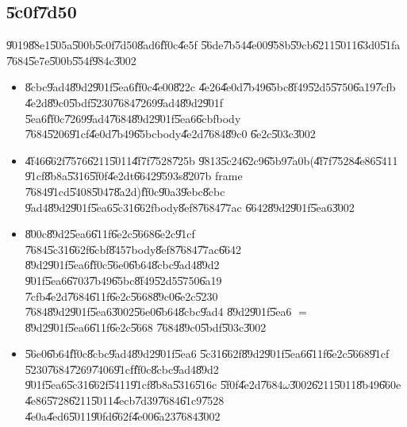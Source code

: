 \documentclass[12pt,a4paper]{article}
\begin{document}
\bigskip 

\subsection{\U{5c0f}\U{7d50}}

\U{9019}\U{88e1}\U{505a}\U{500b}\U{5c0f}\U{7d50}\U{8ad6}\U{ff0c}\U{4e5f}%
\U{56de}\U{7b54}\U{4e00}\U{958b}\U{59cb}\U{6211}\U{5011}\U{63d0}\U{51fa}%
\U{7684}\U{5e7e}\U{500b}\U{554f}\U{984c}\U{3002}

\begin{itemize}
\item \U{8cbc}\U{9ad4}\U{89d2}\U{901f}\U{5ea6}\U{ff0c}\U{4e00}\U{822c}%
\U{4e26}\U{4e0d}\U{7b49}\U{65bc}\U{8f49}\U{52d5}\U{5750}\U{6a19}\U{7cfb}%
\U{4e2d}\U{89c0}\U{5bdf}\U{5230}\U{7684}\U{7269}\U{9ad4}\U{89d2}\U{901f}%
\U{5ea6}\U{ff0c}\U{7269}\U{9ad4}\U{7684}\U{89d2}\U{901f}\U{5ea6}\U{6cbf}body%
\U{7684}\U{5206}\U{91cf}\U{4e0d}\U{7b49}\U{65bc}body\U{4e2d}\U{7684}\U{89c0}%
\U{6e2c}\U{503c}\U{3002}

\item \U{4f46}\U{662f}\U{7576}\U{6211}\U{5011}\U{4f7f}\U{7528}\U{725b}%
\U{9813}\U{5c24}\U{62c9}\U{65b9}\U{7a0b}(\U{4f7f}\U{7528}\U{4e86}\U{5411}%
\U{91cf}\U{8b8a}\U{5316}\U{5f0f}\U{4e2d}t\U{6642}\U{9593}s\U{8207}b frame%
\U{7684}\U{91cd}\U{5408}\U{5047}\U{8a2d})\U{ff0c}\U{90a3}\U{9ebc}\U{8cbc}%
\U{9ad4}\U{89d2}\U{901f}\U{5ea6}\U{5c31}\U{662f}body\U{8ef8}\U{7684}\U{77ac}%
\U{6642}\U{89d2}\U{901f}\U{5ea6}\U{3002}

\item \U{800c}\U{89d2}\U{5ea6}\U{611f}\U{6e2c}\U{5668}\U{6e2c}\U{91cf}%
\U{7684}\U{5c31}\U{662f}\U{6cbf}\U{8457}body\U{8ef8}\U{7684}\U{77ac}\U{6642}%
\U{89d2}\U{901f}\U{5ea6}\U{ff0c}\U{56e0}\U{6b64}\U{8cbc}\U{9ad4}\U{89d2}%
\U{901f}\U{5ea6}\U{6703}\U{7b49}\U{65bc}\U{8f49}\U{52d5}\U{5750}\U{6a19}%
\U{7cfb}\U{4e2d}\U{7684}\U{611f}\U{6e2c}\U{5668}\U{89c0}\U{6e2c}\U{5230}%
\U{7684}\U{89d2}\U{901f}\U{5ea6}\U{3002}\U{56e0}\U{6b64}\U{8cbc}\U{9ad4}%
\U{89d2}\U{901f}\U{5ea6} $=$ \U{89d2}\U{901f}\U{5ea6}\U{611f}\U{6e2c}\U{5668}%
\U{7684}\U{89c0}\U{5bdf}\U{503c}\U{3002}

\item \U{56e0}\U{6b64}\U{ff0c}\U{8cbc}\U{9ad4}\U{89d2}\U{901f}\U{5ea6}%
\U{5c31}\U{662f}\U{89d2}\U{901f}\U{5ea6}\U{611f}\U{6e2c}\U{5668}\U{91cf}%
\U{5230}\U{7684}\U{7269}\U{7406}\U{91cf}\U{ff0c}\U{8cbc}\U{9ad4}\U{89d2}%
\U{901f}\U{5ea6}\U{5c31}\U{662f}\U{5411}\U{91cf}\U{8b8a}\U{5316}\U{516c}%
\U{5f0f}\U{4e2d}\U{7684}$\omega $\U{3002}\U{6211}\U{5011}\U{8b49}\U{660e}%
\U{4e86}\U{5728}\U{6211}\U{5011}\U{4ecb}\U{7d39}\U{7684}\U{61c9}\U{7528}%
\U{4e0a}\U{4ed6}\U{5011}\U{90fd}\U{662f}\U{4e00}\U{6a23}\U{7684}\U{3002}


\end{itemize}
\end{document}
